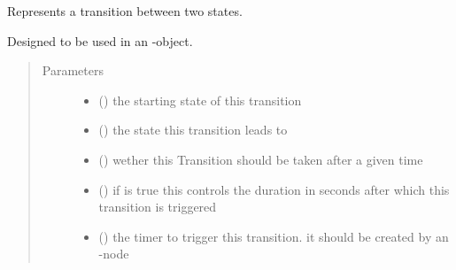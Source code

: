 \documentclass[a4paper,12pt,twoside]{article}
\begin{document}

\begin{fulllineitems}
\label{\detokenize{osbk_operation:osbk_operation.utility.Transition}}
Represents a transition between two states.

Designed to be used in an -object.
\begin{quote}\begin{description}
\item[{Parameters}] \leavevmode\begin{itemize}
\item {} 
 ({\hyperref[\detokenize{osbk_operation:osbk_operation.utility.State}]{}}) \textendash{} the starting state of this transition

\item {} 
 ({\hyperref[\detokenize{osbk_operation:osbk_operation.utility.State}]{}}) \textendash{} the state this transition leads to

\item {} 
 () \textendash{} wether this Transition should be taken after a given time

\item {} 
 () \textendash{} if  is true this controls the duration in seconds after which this
transition is triggered

\item {} 
 () \textendash{} the timer to trigger this transition. it should be created by an 
-node


\end{itemize}
\end{description}
\end{quote}
\end{fulllineitems}
\end{document}
